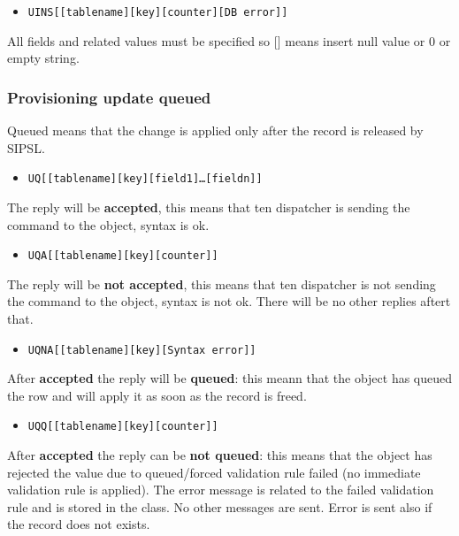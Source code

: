 \documentclass[a4paper]{article}
\begin{document}
\begin{itemize}
	\item {\tt UINS[[tablename][key][counter][DB error]]}
\end{itemize}

All fields and related values must be specified so [] means insert null value or
0 or empty string.

\subsubsection{Provisioning update queued}

Queued means that the change is applied only after the record is released by
SIPSL.


\begin{itemize}
	\item {\tt UQ[[tablename][key][field1]\ldots[fieldn]]}
\end{itemize}


The reply will be {\bf accepted}, this means that ten dispatcher is sending the
command to the object, syntax is ok. 

\begin{itemize}
	\item {\tt UQA[[tablename][key][counter]]}
\end{itemize}

The reply will be {\bf not accepted}, this means that ten dispatcher is not
sending the command to the object, syntax is not ok. There will be no other
replies aftert that.

\begin{itemize}
	\item {\tt UQNA[[tablename][key][Syntax error]]}
\end{itemize}


After {\bf accepted} the reply will be {\bf queued}: this meann that the
object has queued the row and will apply it as soon as the record is freed.

\begin{itemize}
	\item {\tt UQQ[[tablename][key][counter]]}
\end{itemize}

After {\bf accepted} the reply can be {\bf not queued}: this means that the
object has rejected the value due to queued/forced validation rule
failed (no immediate validation rule is applied). The error message is related
to the failed validation rule and is stored in the class. No other messages are sent. 
Error is sent also if the record does not exists.
\end{document}
